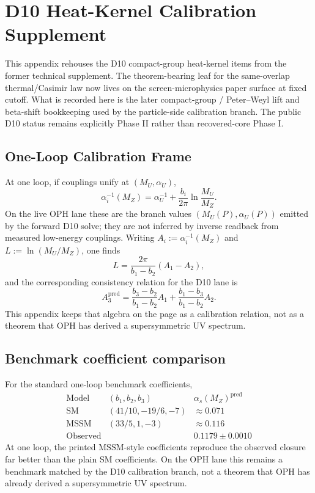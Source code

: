 \section{D10 Heat-Kernel Calibration Supplement}
\label{app:particle-d10-heat-kernel}

This appendix rehouses the D10 compact-group heat-kernel items from the former technical
supplement. The theorem-bearing leaf for the same-overlap thermal/Casimir law now lives on the
screen-microphysics paper surface at fixed cutoff. What is recorded here is the later
compact-group / Peter--Weyl lift and beta-shift bookkeeping used by the particle-side
calibration branch. The public D10 status remains explicitly Phase II rather than recovered-core
Phase I.

\subsection{One-Loop Calibration Frame}

At one loop, if couplings unify at \((M_U,\alpha_U)\),
\[
\alpha_i^{-1}(M_Z)=\alpha_U^{-1}+\frac{b_i}{2\pi}\ln\frac{M_U}{M_Z}.
\]
On the live OPH lane these are the branch values \((M_U(P),\alpha_U(P))\) emitted by the forward
D10 solve; they are not inferred by inverse readback from measured low-energy couplings.
Writing \(A_i:=\alpha_i^{-1}(M_Z)\) and \(L:=\ln(M_U/M_Z)\), one finds
\[
L=\frac{2\pi}{b_1-b_2}(A_1-A_2),
\]
and the corresponding consistency relation for the D10 lane is
\[
A_3^{\mathrm{pred}}
=
\frac{b_3-b_2}{b_1-b_2}A_1
+
\frac{b_1-b_3}{b_1-b_2}A_2.
\]
This appendix keeps that algebra on the page as a calibration relation, not as a theorem that OPH
has derived a supersymmetric UV spectrum.

\subsection{Benchmark coefficient comparison}

For the standard one-loop benchmark coefficients,
\[
\begin{array}{c|c|c}
\text{Model} & (b_1,b_2,b_3) & \alpha_s(M_Z)^{\mathrm{pred}} \\
\hline
\text{SM} & (41/10,-19/6,-7) & \approx 0.071 \\
\text{MSSM} & (33/5,1,-3) & \approx 0.116 \\
\text{Observed} & & 0.1179\pm 0.0010
\end{array}
\]
At one loop, the printed MSSM-style coefficients reproduce the observed closure far better than
the plain SM coefficients. On the OPH lane this remains a benchmark matched by the D10
calibration branch, not a theorem that OPH has already derived a supersymmetric UV spectrum.

